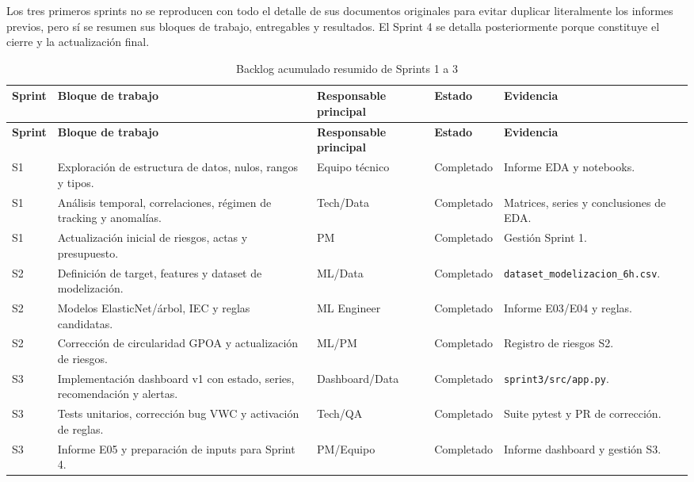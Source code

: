 \documentclass[11pt,a4paper]{article}
\begin{document}
Los tres primeros sprints no se reproducen con todo el detalle de sus documentos originales para evitar duplicar literalmente los informes previos, pero sí se resumen sus bloques de trabajo, entregables y resultados. El Sprint 4 se detalla posteriormente porque constituye el cierre y la actualización final.

\begin{longtable}{p{}p{}p{}p{}p{}}
\caption{Backlog acumulado resumido de Sprints 1 a 3}\\
\toprule
\textbf{Sprint} & \textbf{Bloque de trabajo} & \textbf{Responsable principal} & \textbf{Estado} & \textbf{Evidencia} \\
\midrule
\endfirsthead
\toprule
\textbf{Sprint} & \textbf{Bloque de trabajo} & \textbf{Responsable principal} & \textbf{Estado} & \textbf{Evidencia} \\
\midrule
\endhead
S1 & Exploración de estructura de datos, nulos, rangos y tipos. & Equipo técnico & Completado & Informe EDA y notebooks. \\
S1 & Análisis temporal, correlaciones, régimen de tracking y anomalías. & Tech/Data & Completado & Matrices, series y conclusiones de EDA. \\
S1 & Actualización inicial de riesgos, actas y presupuesto. & PM & Completado & Gestión Sprint 1. \\
S2 & Definición de target, features y dataset de modelización. & ML/Data & Completado & \texttt{dataset\_modelizacion\_6h.csv}. \\
S2 & Modelos ElasticNet/árbol, IEC y reglas candidatas. & ML Engineer & Completado & Informe E03/E04 y reglas. \\
S2 & Corrección de circularidad GPOA y actualización de riesgos. & ML/PM & Completado & Registro de riesgos S2. \\
S3 & Implementación dashboard v1 con estado, series, recomendación y alertas. & Dashboard/Data & Completado & \texttt{sprint3/src/app.py}. \\
S3 & Tests unitarios, corrección bug VWC y activación de reglas. & Tech/QA & Completado & Suite pytest y PR de corrección. \\
S3 & Informe E05 y preparación de inputs para Sprint 4. & PM/Equipo & Completado & Informe dashboard y gestión S3. \\
\bottomrule
\end{longtable}

\newpage
\end{document}
